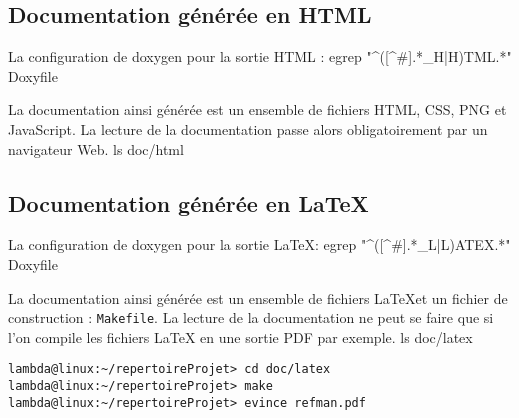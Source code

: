 \documentclass[12pt,a4paper,oneside,titlepage,final]{article}
\begin{document}
\subsection{Documentation générée en HTML}
\label{annexe:htmlOutputDoc}
La configuration de \gls{doxygen} pour la sortie HTML :
\bash[stdout]
egrep "^([^#].*_H|H)TML.*" Doxyfile
\END

La documentation ainsi générée est un ensemble de fichiers HTML, CSS, PNG et
JavaScript. La lecture de la documentation passe alors obligatoirement
par un navigateur Web.
\bash[stdout]
ls doc/html
\END


\subsection{Documentation générée en \LaTeX}
\label{annexe:latexOutputDoc}
La configuration de \gls{doxygen} pour la sortie \LaTeX :
\bash[stdout]
egrep "^([^#].*_L|L)ATEX.*" Doxyfile
\END

La documentation ainsi générée est un ensemble de fichiers \LaTeX et
un fichier de construction : \lstinline{Makefile}. La lecture de la
documentation ne peut se faire que si l'on compile les fichiers \LaTeX
en une sortie PDF par exemple.
\bash[stdout]
ls doc/latex
\END

\begin{lstlisting}[style=groolotScript,caption={Instruction pour compiler la documentation \LaTeX en PDF}]
lambda@linux:~/repertoireProjet> cd doc/latex
lambda@linux:~/repertoireProjet> make
lambda@linux:~/repertoireProjet> evince refman.pdf
\end{lstlisting}



\newpage \printbibheading
\printbibliography[nottype=online,check=notonline,heading=subbibliography,title={Bibliographiques}]
\printbibliography[check=online,heading=subbibliography,title={Webographiques}]

\printglossaries
\end{document}
